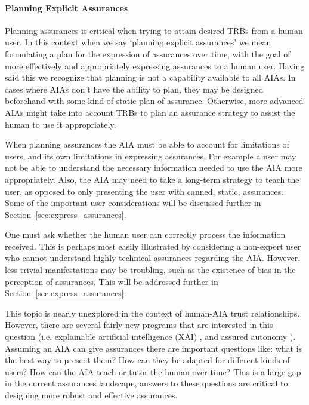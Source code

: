     \paragraph{Planning Explicit Assurances} Planning assurances is critical when trying to attain desired TRBs from a human user. In this context when we say `planning explicit assurances' we mean formulating a plan for the expression of assurances over time, with the goal of more effectively and appropriately expressing assurances to a human user. Having said this we recognize that planning is not a capability available to all AIAs. In cases where AIAs don't have the ability to plan, they may be designed beforehand with some kind of static plan of assurance. Otherwise, more advanced AIAs might take into account TRBs to plan an assurance strategy to assist the human to use it appropriately.

    When planning assurances the AIA must be able to account for limitations of users, and its own limitations in expressing assurances. For example a user may not be able to understand the necessary information needed to use the AIA more appropriately. Also, the AIA may need to take a long-term strategy to teach the user, as opposed to only presenting the user with canned, static, assurances. Some of the important user considerations will be discussed further in Section~\ref{sec:express_assurances}.
    
    One must ask whether the human user can correctly process the information received. This is perhaps most easily illustrated by considering a non-expert user who cannot understand highly technical assurances regarding the AIA. However, less trivial manifestations may be troubling, such as the existence of bias in the perception of assurances. This will be addressed further in Section~\ref{sec:express_assurances}.

    This topic is nearly unexplored in the context of human-AIA trust relationships. However, there are several fairly new programs that are interested in this question (i.e. explainable artificial intelligence (XAI) \cite{Gunning2016-kb}, and assured autonomy \cite{Neema2017-bb}). Assuming an AIA can give assurances there are important questions like: what is the best way to present them? How can they be adapted for different kinds of users? How can the AIA teach or tutor the human over time? This is a large gap in the current assurances landscape, answers to these questions are critical to designing more robust and effective assurances.

